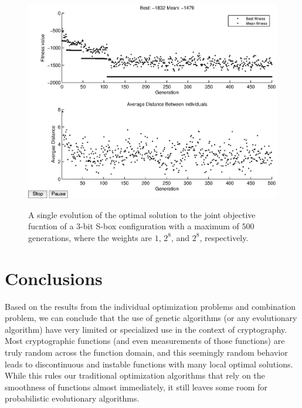 \documentclass[11pt]{article}
\begin{document}
\begin{figure}[!ht]
	\centering
	\includegraphics[scale=0.5]{images/joint_results16.eps} 
	\label{joint16}
\caption{A single evolution of the optimal solution to the joint objective fucntion of a $3$-bit S-box configuration with a maximum of $500$ generations, where the weights are $1$, $2^8$, and $2^8$, respectively.}
	\label{joint16}
\end{figure}


\section{Conclusions}

Based on the results from the individual optimization problems and combination problem, we can conclude that the use of genetic algorithms (or any evolutionary algorithm) have very limited or specialized use in the context of cryptography. Most cryptographic functions (and even measurements of those functions) are truly random across the function domain, and this seemingly random behavior leads to discontinuous and instable functions with many local optimal solutions. While this rules our traditional optimization algorithms that rely on the smoothness of functions almost immediately, it still leaves some room for probabilistic evolutionary algorithms. 
\end{document}
